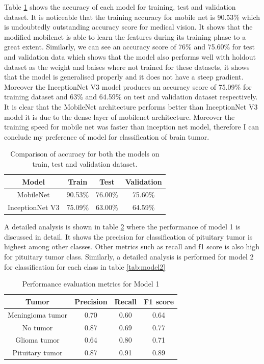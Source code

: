 \documentclass[12pt, a4paper,twoside]{report}
\theoremstyle{plain} %
\theoremstyle{definition} %
\theoremstyle{remark} %
\numberwithin{equation}{chapter}
\begin{document}
Table \ref{tab:perf_acc} shows the accuracy of each model for training, test and validation dataset. It is noticeable that the training accuracy for mobile net is 90.53\% which is undoubtedly outstanding accuracy score for medical vision. It shows that the modified mobilenet is able to learn the features during its training phase to a great extent. Similarly, we can see an accuracy score of 76\% and 75.60\% for test and validation data which shows that the model also performs well with holdout dataset as the weight and baises where not trained for these datasets, it shows that the model is generalised properly and it does not have a steep gradient. Moreover the InceptionNet V3 model produces an accuracy score of 75.09\% for training dataset and 63\% and 64.59\% on test and validation dataset respectively. It is clear that the MobileNet architecture performs better than  InceptionNet V3 model it is due to the dense layer of mobilenet architecture. Moreover the training speed for mobile net was faster than inception net model, therefore I can conclude my preference of model for classification of brain tumor. 

\begin{table}[h]
    \centering
    \begin{tabular}{|c|c|c|c|}
     \hline
    Model  & Train & Test & Validation  \\  \hline
    MobileNet & 90.53\% & 76.00\% & 75.60\% \\
    InceptionNet V3 & 75.09\% & 63.00\% & 64.59\% \\
    \hline
    \end{tabular}
    \caption{Comparison of accuracy for both the models on train, test and validation dataset.}
    \label{tab:perf_acc}
\end{table}

A detailed analysis is shown in table \ref{tab:model1} where the performance of model 1 is discussed in detail. It shows the precision for classification of pituitary tumor is highest among other classes. Other metrics such as recall and f1 score is also high for pituitary tumor class. Similarly, a detailed analysis is performed for model 2 for classification for each class in table \ref{tab:model2}

\begin{table}[h]
    \centering
    \begin{tabular}{|c|c|c|c|}
     \hline
    Tumor  & Precision & Recall & F1 score  \\  \hline
    Meningioma tumor & 0.70 & 0.60 & 0.64 \\
    No tumor & 0.87 & 0.69 & 0.77 \\
    Glioma tumor & 0.64 & 0.80 & 0.71 \\
    Pituitary tumor & 0.87 & 0.91 & 0.89 \\
    \hline
    \end{tabular}
    \caption{Performance evaluation metrics for Model 1}
    \label{tab:model1}
\end{table}
\end{document}
